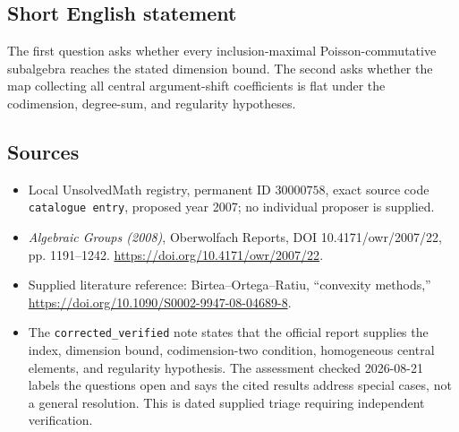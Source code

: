 \documentclass[11pt]{article}
\begin{document}
\subsection{Short English statement}
The first question asks whether every inclusion-maximal Poisson-commutative subalgebra reaches the stated dimension bound. The second asks whether the map collecting all central argument-shift coefficients is flat under the codimension, degree-sum, and regularity hypotheses.
\subsection{Sources}
\begin{itemize}
\item Local UnsolvedMath registry, permanent ID \(30000758\), exact source code \texttt{catalogue entry}, proposed year 2007; no individual proposer is supplied.
\item \emph{Algebraic Groups (2008)}, Oberwolfach Reports, DOI 10.4171/owr/2007/22, pp. 1191--1242. \url{https://doi.org/10.4171/owr/2007/22}.
\item Supplied literature reference: Birtea--Ortega--Ratiu, ``convexity methods,'' \url{https://doi.org/10.1090/S0002-9947-08-04689-8}.
\item The \texttt{corrected\_verified} note states that the official report supplies the index, dimension bound, codimension-two condition, homogeneous central elements, and regularity hypothesis. The assessment checked 2026-08-21 labels the questions open and says the cited results address special cases, not a general resolution. This is dated supplied triage requiring independent verification.
\end{itemize}
\end{document}

